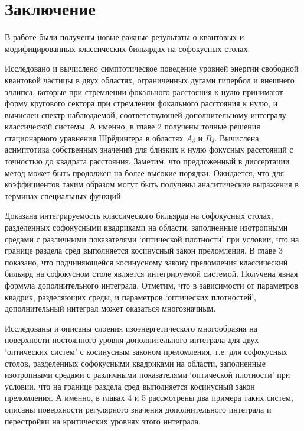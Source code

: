 \chapter*{Заключение}                       %


В работе были получены новые важные результаты о квантовых и модифицированных классических бильярдах на софокусных столах.

Исследовано и вычислено симптотическое поведение уровней энергии свободной квантовой частицы в двух областях, ограниченных дугами гипербол и внешнего эллипса, которые при стремлении фокального расстояния к нулю принимают форму кругового сектора при стремлении фокального расстояния к нулю, и вычислен спектр наблюдаемой, соответствующей дополнительному интегралу классической системы.
А именно, в главе 2 получены точные решения стационарного уравнения Шрёдингера в областях $A_\delta$ и $B_\delta$. Вычислена асимптотика собственных значений для близких к нулю фокусных расстояний с точностью до квадрата расстояния. 
Заметим, что предложенный в диссертации метод может быть продолжен на более высокие порядки. Ожидается, что для коэффициентов таким образом могут быть получены аналитические выражения в терминах специальных функций.

Доказана интегрируемость классического бильярда на софокусных столах, разделенных софокусными квадриками на области, заполненные изотропными средами с различными показателями `оптической плотности' при условии, что на границе раздела сред выполняется косинусный закон преломления.
В главе 3 показано, что подчиняющейся косинусному закону преломления классический бильярд на софокусном столе является интегрируемой системой. 
Получена явная формула дополнительного интеграла. Отметим, что в зависимости от параметров квадрик, разделяющих среды, и параметров `оптических плотностей', дополнительный интеграл может оказаться многозначным. 


Исследованы и описаны слоения изоэнергетического многообразия на поверхности постоянного уровня дополнительного интеграла для двух `оптических систем' с косинусным законом преломления, т.е. для софокусных столов, разделенных софокусными квадриками на области, заполненные изотропными средами с различными показателями `оптической плотности'  при условии, что на границе раздела сред выполняется косинусный закон преломления.
А именно, в главах 4 и 5 рассмотрены два примера таких систем, описаны поверхности регулярного значения дополнительного интеграла и перестройки на критических уровнях этого интеграла. 

